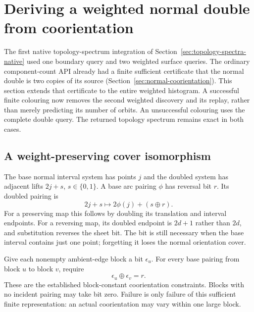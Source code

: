 \section{Deriving a weighted normal double from coorientation}
\label{sec:weighted-coorientation}

The first native topology-spectrum integration of
Section~\ref{sec:topology-spectra-native} used one boundary query and two
weighted surface queries. The ordinary component-count API already had a
finite sufficient certificate that the normal double is two copies of its
source (Section~\ref{sec:normal-coorientation}). This section extends that
certificate to the entire weighted histogram. A successful finite colouring
now removes the second weighted discovery and its replay, rather than merely
predicting its number of orbits. An unsuccessful colouring uses the complete
double query. The returned topology spectrum remains exact in both cases.

\subsection{A weight-preserving cover isomorphism}

The base normal interval system has points $j$ and the doubled system has
adjacent lifts $2j+s$, $s\in\{0,1\}$. A base arc pairing $\phi$ has reversal
bit $r$. Its doubled pairing is
\[
 2j+s\longmapsto2\phi(j)+(s\mathbin\oplus r).
\]
For a preserving map this follows by doubling its translation and interval
endpoints. For a reversing map, its doubled endpoint is $2d+1$ rather than
$2d$, and substitution reverses the sheet bit. The bit is still necessary
when the base interval contains just one point; forgetting it loses the
normal orientation cover.

Give each nonempty ambient-edge block a bit $\epsilon_u$. For every base
pairing from block $u$ to block $v$, require
\[
 \epsilon_u\mathbin\oplus\epsilon_v=r.
\]
These are the established block-constant coorientation constraints. Blocks
with no incident pairing may take bit zero. Failure is only failure of this
sufficient finite representation: an actual coorientation may vary within
one large block.

